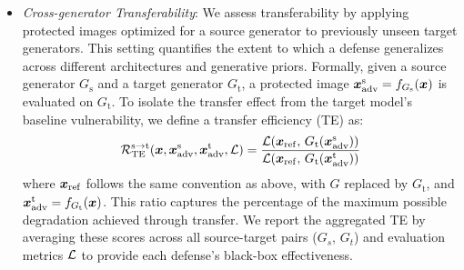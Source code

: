 \documentclass{article}
\begin{document}
\begin{itemize}[leftmargin=*, nosep]
    \item \emph{Cross-generator Transferability}: We assess transferability by applying protected images optimized for a source generator to previously unseen target generators. This setting quantifies the extent to which a defense generalizes across different architectures and generative priors. Formally, given a source generator $G_{\mathrm{s}}$ and a target generator $G_{\mathrm{t}}$, a protected image ${\bm{x}}_{\mathrm{adv}}^{\mathrm{s}} = f_{G_{\mathrm{s}}}({\bm{x}})$ is evaluated on $G_{\mathrm{t}}$. To isolate the transfer effect from the target model's baseline vulnerability, we define a transfer efficiency (TE) as:     
    \begin{equation}
        \mathcal{R}_{\mathrm{TE}}^{\mathrm{s}\rightarrow \mathrm{t}}({\bm{x}}, {\bm{x}}_{\mathrm{adv}}^{\mathrm{s}}, {\bm{x}}_{\mathrm{adv}}^{\mathrm{t}},{\mathcal{L}}) = 
        \frac{{\mathcal{L}}\!\left({\bm{x}}_{\mathrm{ref}},\, G_{\mathrm{t}}({\bm{x}}_{\mathrm{adv}}^{\mathrm{s}})\right)}{{\mathcal{L}}\!\left({\bm{x}}_{\mathrm{ref}},\, G_{\mathrm{t}}({\bm{x}}_{\mathrm{adv}}^{\mathrm{t}})\right)
        }
    \end{equation}
    where ${\bm{x}}_{\mathrm{ref}}$ follows the same convention as above, with $G$ replaced by $G_{\mathrm{t}}$, and ${\bm{x}}_{\mathrm{adv}}^{\mathrm{t}} = f_{G_{\mathrm{t}}}({\bm{x}})$. This ratio captures the percentage of the maximum possible degradation achieved through transfer. We report the aggregated TE by averaging these scores across all source-target pairs ($G_s$, $G_t$) and evaluation metrics ${\mathcal{L}}$ to provide each defense's black-box effectiveness.    
\end{itemize}

\end{document}
